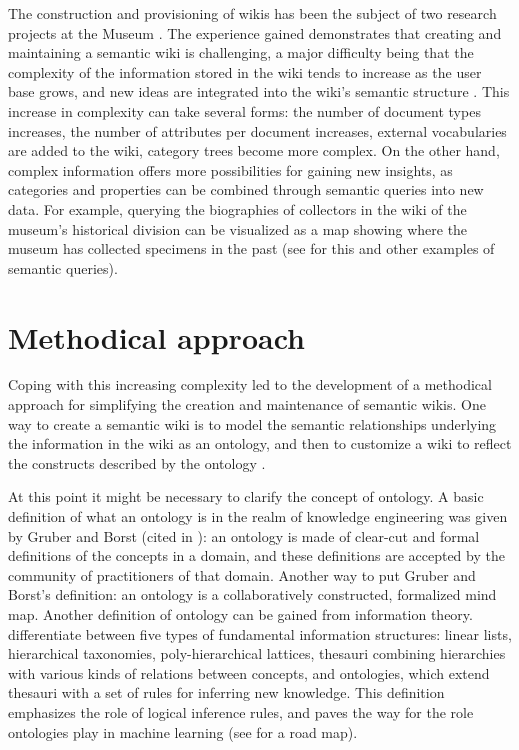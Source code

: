 \documentclass[manuscript,screen,review]{acmart}
\begin{document}
The construction and provisioning of wikis has been the subject of two research projects at the Museum \cite{patzschke2016}. The experience gained demonstrates that creating and maintaining a semantic wiki is challenging, a major difficulty being that the complexity of the information stored in the wiki tends to increase as the user base grows, and new ideas are integrated into the wiki's semantic structure \cite{kiniti2013}. This increase in complexity can take several forms: the number of document types increases, the number of attributes per document increases, external vocabularies are added to the wiki, category trees become more complex. On the other hand, complex information offers more possibilities for gaining new insights, as categories and properties can be combined through semantic queries into new data. For example, querying the biographies of collectors in the wiki of the museum's historical division can be visualized as a map showing where the museum has collected specimens in the past (see \cite{ortiz2016} for this and other examples of semantic queries).

\section{Methodical approach}
Coping with this increasing complexity led to the development of a methodical approach for simplifying the creation and maintenance of semantic wikis. One way to create a semantic wiki is to model the semantic relationships underlying the information in the wiki as an ontology, and then to customize a wiki to reflect the constructs described by the ontology \cite{diiorio2006}. 

At this point it might be necessary to clarify the concept of ontology. A basic definition of what an ontology is in the realm of knowledge engineering was given by Gruber and Borst (cited in \cite{corcho2003}): an ontology is made of clear-cut and formal definitions of the concepts in a domain, and these definitions are accepted by the community of practitioners of that domain. Another way to put Gruber and Borst's definition: an ontology is a collaboratively constructed, formalized mind map.
Another definition of ontology can be gained from information theory. \citeauthor{pieterse2014} differentiate between five types of fundamental information structures: linear lists, hierarchical taxonomies, poly-hierarchical lattices, thesauri combining hierarchies with various kinds of relations between concepts, and ontologies, which extend thesauri with a set of rules for inferring new knowledge. This definition emphasizes the role of logical inference rules, and paves the way for the role ontologies play in machine learning (see \citeauthor{zhou2007} for a road map).
\end{document}
